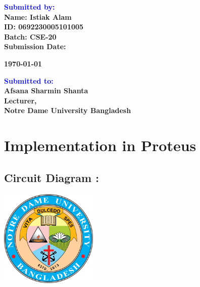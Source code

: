 \documentclass[12pt]{article}
\begin{document}
\begin{titlepage}
\begin{center}
    \vspace{1em}
    \begin{flushleft}
        \textbf{\Huge \textcolor{blue}{Submitted by:}} \\
        \vspace{0.3cm}
        \textbf{\Large Name: Istiak Alam} \\
        \vspace{0.3cm}
        \textbf{\Large ID: 0692230005101005} \\
		\vspace{0.3cm}        
        \textbf{\Large Batch: CSE-20} \\
        \vspace{0.5cm}
        \textbf{\Large Submission Date: }{\Large \textbf{\today}\par}
    \end{flushleft}
    \vfill
    \begin{flushleft}
        \textbf{\Huge \textcolor{blue}{Submitted to:}} \\
        \vspace{0.3cm}
        \textbf{\Large Afsana Sharmin Shanta} \\
        \vspace{0.3cm}
        \textbf{\Large Lecturer,} \\
        \vspace{0.3cm}
        \textbf{\Large Notre Dame University Bangladesh}
    \end{flushleft}
\end{center}
\end{titlepage}						%


\newpage
\section*{Implementation in Proteus}
\subsection*{Circuit Diagram : }
\includegraphics[width=0.35\textwidth]{logo.png}
\end{document}
